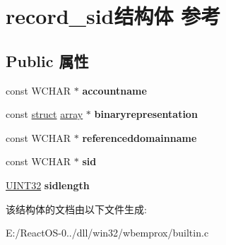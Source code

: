 \hypertarget{structrecord__sid}{}\section{record\+\_\+sid结构体 参考}
\label{structrecord__sid}
\subsection*{Public 属性}
\begin{DoxyCompactItemize}
\item 
\mbox{\label{structrecord__sid_a35137b93a9d647703abef4de4682e46d}} 
const W\+C\+H\+AR $\ast$ {\bfseries accountname}
\item 
\mbox{\label{structrecord__sid_ac5d72635f990202d487020153541ac6d}} 
const \hyperlink{interfacestruct}{struct} \hyperlink{structarray}{array} $\ast$ {\bfseries binaryrepresentation}
\item 
\mbox{\label{structrecord__sid_a8b33dd18f3bafa6de8d3006b94e17323}} 
const W\+C\+H\+AR $\ast$ {\bfseries referenceddomainname}
\item 
\mbox{\label{structrecord__sid_acccb25ac48c866e33ceaa2dcd716fd2c}} 
const W\+C\+H\+AR $\ast$ {\bfseries sid}
\item 
\mbox{\label{structrecord__sid_ace27b3ddfc93181d0b9deec85248fd00}} 
\hyperlink{_processor_bind_8h_ae1e6edbbc26d6fbc71a90190d0266018}{U\+I\+N\+T32} {\bfseries sidlength}
\end{DoxyCompactItemize}


该结构体的文档由以下文件生成\+:\begin{DoxyCompactItemize}
\item 
E\+:/\+React\+O\+S-\/0../dll/win32/wbemprox/builtin.\+c\end{DoxyCompactItemize}
